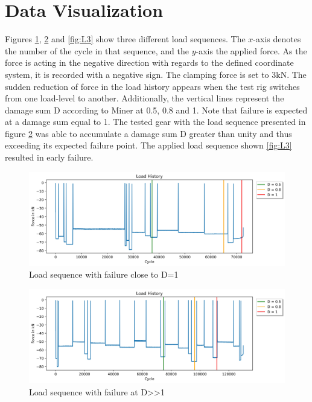 \section{Data Visualization}\label{DV}
Figures \ref{fig:L1}, \ref{fig:L2} and \ref{fig:L3}  show three different load sequences. The \(x\)-axis denotes the number of the cycle in that sequence, and the \(y\)-axis the applied force. As the force is acting in the negative direction with regards to the defined coordinate system, it is recorded with a negative sign. The clamping force is set to 3kN. The sudden reduction of force in the load history appears when the test rig switches from one load-level to another. 
Additionally, the vertical lines represent the damage sum D according to Miner at 0.5, 0.8 and 1. Note that failure is expected at a damage sum equal to 1. The tested gear with the load sequence presented in figure \ref{fig:L2} was able to accumulate a damage sum D greater than unity and thus exceeding its expected failure point. The applied load sequence shown \ref{fig:L3} resulted in early failure.

\begin{figure}[H]
	\centering
	\includegraphics[width=1\linewidth]{IMGs/Load/L0.jpg}
	\caption{Load sequence with failure close to D=1}
	\label{fig:L1}
\end{figure}

\begin{figure}[H]
	\centering
	\includegraphics[width=1\linewidth]{IMGs/Load/L1.jpg}
	\caption{Load sequence with failure at D>>1}
	\label{fig:L2}
\end{figure}

